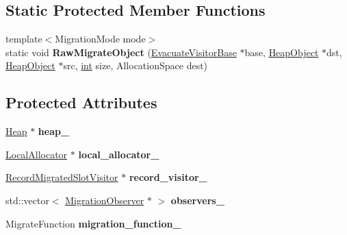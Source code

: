\subsection*{Static Protected Member Functions}
\begin{DoxyCompactItemize}
\item 
\mbox{\label{classv8_1_1internal_1_1EvacuateVisitorBase_a3e104c8ec889e3a99f27e46c56b74cc2}} 
{\footnotesize template$<$Migration\+Mode mode$>$ }\\static void {\bfseries Raw\+Migrate\+Object} (\mbox{\hyperlink{classv8_1_1internal_1_1EvacuateVisitorBase}{Evacuate\+Visitor\+Base}} $\ast$base, \mbox{\hyperlink{classv8_1_1internal_1_1HeapObject}{Heap\+Object}} $\ast$dst, \mbox{\hyperlink{classv8_1_1internal_1_1HeapObject}{Heap\+Object}} $\ast$src, \mbox{\hyperlink{classint}{int}} size, Allocation\+Space dest)
\end{DoxyCompactItemize}
\subsection*{Protected Attributes}
\begin{DoxyCompactItemize}
\item 
\mbox{\label{classv8_1_1internal_1_1EvacuateVisitorBase_a0c3cbd23e8f28a0038f6d93b38bbdbbb}} 
\mbox{\hyperlink{classv8_1_1internal_1_1Heap}{Heap}} $\ast$ {\bfseries heap\+\_\+}
\item 
\mbox{\label{classv8_1_1internal_1_1EvacuateVisitorBase_aa2ff3229aa16c450bb038cfbaae3be8f}} 
\mbox{\hyperlink{classv8_1_1internal_1_1LocalAllocator}{Local\+Allocator}} $\ast$ {\bfseries local\+\_\+allocator\+\_\+}
\item 
\mbox{\label{classv8_1_1internal_1_1EvacuateVisitorBase_a6a58e9aa2a85e1afbd833fb49c17df54}} 
\mbox{\hyperlink{classv8_1_1internal_1_1RecordMigratedSlotVisitor}{Record\+Migrated\+Slot\+Visitor}} $\ast$ {\bfseries record\+\_\+visitor\+\_\+}
\item 
\mbox{\label{classv8_1_1internal_1_1EvacuateVisitorBase_af11ebcfa59df555e097b381c1125beb0}} 
std\+::vector$<$ \mbox{\hyperlink{classv8_1_1internal_1_1MigrationObserver}{Migration\+Observer}} $\ast$ $>$ {\bfseries observers\+\_\+}
\item 
\mbox{\label{classv8_1_1internal_1_1EvacuateVisitorBase_afd183ddd5f921860066ac73daedb16be}} 
Migrate\+Function {\bfseries migration\+\_\+function\+\_\+}
\end{DoxyCompactItemize}


